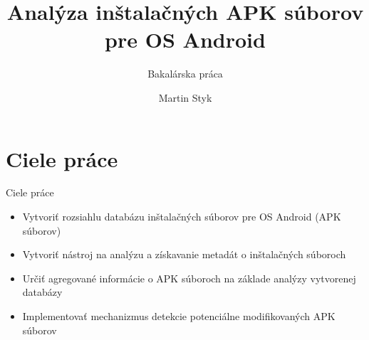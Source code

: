 \documentclass{beamer}
\title{Analýza inštalačných APK súborov pre OS Android} %
\subtitle{Bakalárska práca} %
\author{Martin Styk}
\begin{document}
  \frame{\maketitle}

\section{Ciele práce}
  \begin{frame}[label=lists]{Ciele práce}
    \begin{itemize}
    \item Vytvoriť rozsiahlu databázu inštalačných súborov pre OS Android (APK súborov)
	\item Vytvoriť nástroj na analýzu a získavanie metadát o inštalačných súboroch
	\item Určiť agregované informácie o APK súboroch na základe analýzy vytvorenej databázy
	\item Implementovať mechanizmus detekcie potenciálne modifikovaných APK súborov
    \end{itemize}  
  \end{frame}
  
\end{document}
